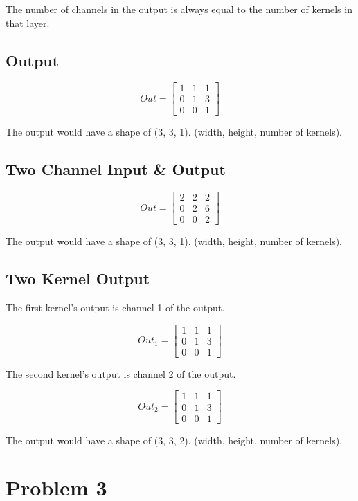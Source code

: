 \documentclass[12pt]{article}
\begin{document}
The number of channels in the output is always equal to the number of kernels
 in that layer.

\subsection{Output}

$$
Out =
\begin{bmatrix}
  1 & 1 & 1 \\
  0 & 1 & 3 \\
  0 & 0 & 1
\end{bmatrix}
$$

The output would have a shape of (3, 3, 1).
(width, height, number of kernels).

\subsection{Two Channel Input \& Output}

$$
Out =
\begin{bmatrix}
  2 & 2 & 2 \\
  0 & 2 & 6 \\
  0 & 0 & 2
\end{bmatrix}
$$

The output would have a shape of (3, 3, 1).
(width, height, number of kernels).

\subsection{Two Kernel Output}

The first kernel's output is channel 1 of the output.

$$
Out_1 =
\begin{bmatrix}
  1 & 1 & 1 \\
  0 & 1 & 3 \\
  0 & 0 & 1
\end{bmatrix}
$$

The second kernel's output is channel 2 of the output.

$$
Out_2 =
\begin{bmatrix}
  1 & 1 & 1 \\
  0 & 1 & 3 \\
  0 & 0 & 1
\end{bmatrix}
$$

The output would have a shape of (3, 3, 2).
(width, height, number of kernels).

\section{Problem 3}
\end{document}
